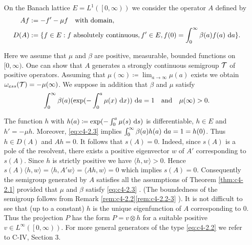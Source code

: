 \begin{example}\label{ex:c4-2.3}
On the Banach lattice $E = L^{1}(\left[0,\infty\right))$ we consider the operator $A$ defined by
\begin{equation} \label{eq:c4-2.2}
\begin{split}
Af &:= -f' - \mu f \quad \text{with domain},\\
D(A) &:= \{f \in E : f \text{ absolutely continuous}, f' \in E, f(0) = \int_{0}^{\infty} \beta(a)f(a) \, \mathop{}\!\mathrm{d}{a} \}.
\end{split}
\end{equation}

Here we assume that $\mu$ and $\beta$ are positive, measurable, bounded functions on $[0,\infty)$.
One can show that $A$ generates a strongly continuous semigroup $\mathcal{T}$ of positive operators.
Assuming that $\mu(\infty) \coloneqq \lim_{a \to \infty}\mu(a)$ exists we obtain $\omega_{ess}(\mathcal{T}) = -\mu(\infty)$.
We suppose in addition that $\beta$ and $\mu$ satisfy
\begin{equation}\label{eq:c4-2.3}
\int_{0}^{\infty} \beta(a)(\exp(-\int_{0}^{a} \mu(x) \, \mathop{}\!\mathrm{d}{x}))\, \mathop{}\!\mathrm{d}{a} = 1 \quad \text{and} \quad \mu(\infty) > 0.
\end{equation}

The function $h$ with $h(a) \coloneqq \exp(-\int_{0}^{a} \mu(s) \, \mathop{}\!\mathrm{d}{s})$ is differentiable, $h \in E$ and $h' = -\mu h$.
Moreover, \ref{eq:c4-2.3} implies $\int_{0}^{\infty} \beta(a)h(a) \, \mathop{}\!\mathrm{d}{a} = 1 = h(0)$.
Thus $h \in D(A)$ and $Ah = 0$.
It follows that $s(A) = 0$.
Indeed, since $s(A)$ is a pole of the resolvent, there exists a positive eigenvector $w$ of $A'$ corresponding to $s(A)$.
Since $h$ is
strictly positive we have $\langle h,w \rangle > 0$. Hence $s(A)\langle h,w \rangle = \langle h,A'w \rangle = \langle Ah,w \rangle = 0$ which implies $s(A) = 0$.
Consequently the semigroup generated by $A$ satisfies all the assumptions of Theorem \ref{thm:c4-2.1} provided that $\mu$ and $\beta$ satisfy \eqref{eq:c4-2.3} .
(The boundedness of the semigroup follows from Remark \ref{rem:c4-2.2}\ref{rem:c4-2.2-3} ).
It is not difficult to see that (up to a constant) $h$ is the unique eigenfunction of $A$ corresponding to $0$.
Thus the projection $P$ has the form $P = v \otimes h$ for a suitable positive $v \in L^{\infty}(\left[0,\infty\right))$.
For more general generators of the type \eqref{eq:c4-2.2} we refer to C-IV, Section 3.
\end{example}

